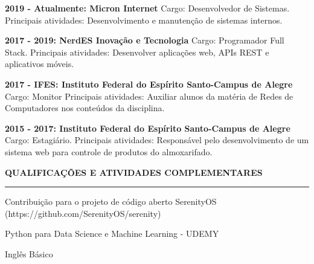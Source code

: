 \documentclass[a4paper,10pt]{article}
\begin{document}
\begin{itemize}
    \begin{item}
        \textbf{2019 - Atualmente: Micron Internet}
        \newline
        Cargo: Desenvolvedor de Sistemas.
        \newline
        Principais atividades: Desenvolvimento e manutenção de sistemas internos.
    \end{item}
    \begin{item}
        \textbf{2017 - 2019: NerdES Inova\c{c}\~{a}o e Tecnologia}
        \newline
        Cargo: Programador Full Stack.
        \newline
        Principais atividades: Desenvolver aplica\c{c}\~{o}es web, APIs REST e aplicativos móveis.
    \end{item}
    \begin{item}
        \textbf{2017 - IFES: Instituto Federal do Esp\'{i}rito Santo-Campus de Alegre}
        \newline
        Cargo: Monitor
       \newline
        Principais atividades: Auxiliar alunos da matéria de Redes de Computadores nos conteúdos da disciplina.
    \end{item}
    \begin{item}
        \textbf{2015 - 2017: Instituto Federal do Esp\'{i}rito Santo-Campus de Alegre}
        \newline
        Cargo: Estagi\'{a}rio.
       \newline
        Principais atividades: Respons\'{a}vel pelo desenvolvimento de um sistema web para controle de produtos do 
        \newline
        almoxarifado.
        \newline
    \end{item}
\end{itemize}

\begin{flushleft}
\textbf{QUALIFICA\c{C}\~{O}ES E ATIVIDADES COMPLEMENTARES}
\noindent\textcolor{gray}{\rule{18cm}{1px}}
\end{flushleft}

\begin{itemize}
    \begin{item}
        Contribuição para o projeto de código aberto SerenityOS (https://github.com/SerenityOS/serenity)
    \end{item}
    \begin{item}
        Python para Data Science e Machine Learning - UDEMY
    \end{item}
    \begin{item}
        Ingl\^{e}s Básico
    \end{item}
    \newline
\end{itemize}
    
\end{document}
